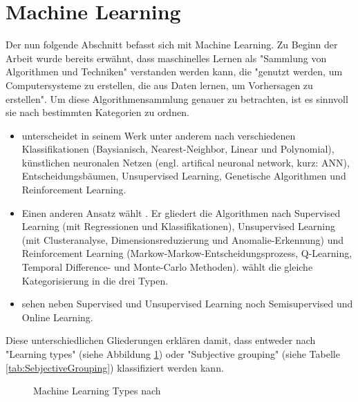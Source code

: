 \section{Machine Learning}\label{sec:MachineLearning}
Der nun folgende Abschnitt befasst sich mit Machine Learning. Zu Beginn der Arbeit wurde bereits erwähnt, dass maschinelles Lernen als "Sammlung von Algorithmen und Techniken" verstanden werden kann, die "genutzt werden, um Computersysteme zu erstellen, die aus Daten lernen, um Vorhersagen zu erstellen".\citep[S.~53; eigene Übersetzung]{swamynathan_mastering_2017} Um diese Algorithmensammlung genauer zu betrachten, ist es sinnvoll sie nach bestimmten Kategorien zu ordnen. 
\begin{itemize}
\item \citep{kubat_introduction_2017} unterscheidet in seinem Werk unter anderem nach verschiedenen Klassifikationen (Baysianisch, Nearest-Neighbor, Linear und Polynomial), künstlichen neuronalen Netzen (engl. artifical neuronal network, kurz: ANN), Entscheidungsbäumen, Unsupervised Learning, Genetische Algorithmen und Reinforcement Learning.
\item Einen anderen Ansatz wählt \citep{swamynathan_mastering_2017}. Er gliedert die Algorithmen nach Supervised Learning (mit Regressionen und Klassifikationen), Unsupervised Learning (mit Clusteranalyse, Dimensionsreduzierung und Anomalie-Erkennung) und Reinforcement Learning (Markow-Markow-Entscheidungsprozess, Q-Learning, Temporal Difference- und Monte-Carlo Methoden). \citep{kim_matlab_2017} wählt die gleiche Kategorisierung in die drei Typen.
\item \citep{paluszek_matlab_2017} sehen neben Supervised und Unsupervised Learning noch Semisupervised und Online Learning.
\end{itemize}
Diese unterschiedlichen Gliederungen erklären \citep[S.~222]{ramasubramanian_machine_2017} damit, dass entweder nach "Learning types" (siehe Abbildung \ref{fig:MachineLearningTypes_all}) oder "Subjective grouping" (siehe Tabelle \ref{tab:SebjectiveGrouping}) klassifiziert werden kann.
\begin{figure}[H]
\caption{Machine Learning Types nach  \citep[S.~222]{ramasubramanian_machine_2017}}
\label{fig:MachineLearningTypes_all}
\centering
\end{figure}


